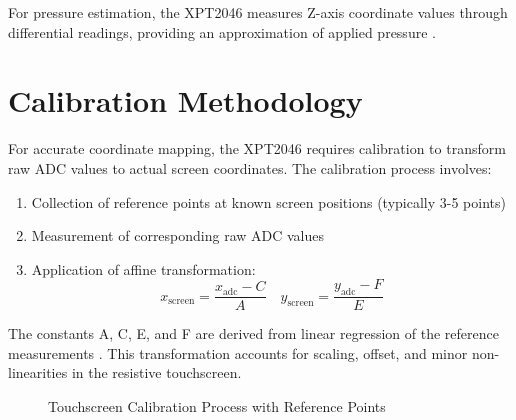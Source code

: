 For pressure estimation, the XPT2046 measures Z-axis coordinate values through differential readings, providing an approximation of applied pressure \cite{xpt2046:2007}.

\section{Calibration Methodology}

For accurate coordinate mapping, the XPT2046 requires calibration to transform raw ADC values to actual screen coordinates. The calibration process involves:

\begin{enumerate}
	\item Collection of reference points at known screen positions (typically 3-5 points)
	\item Measurement of corresponding raw ADC values
	\item Application of affine transformation:
	\begin{equation}
		x_{\text{screen}} = \frac{x_{\text{adc}} - C}{A} \quad y_{\text{screen}} = \frac{y_{\text{adc}} - F}{E}
	\end{equation}
\end{enumerate}

The constants A, C, E, and F are derived from linear regression of the reference measurements \cite{MakingItUp:2017}. This transformation accounts for scaling, offset, and minor non-linearities in the resistive touchscreen.

\begin{figure}[ht]
	\centering
	\caption{Touchscreen Calibration Process with Reference Points}
	\label{fig:calibration}
\end{figure}

